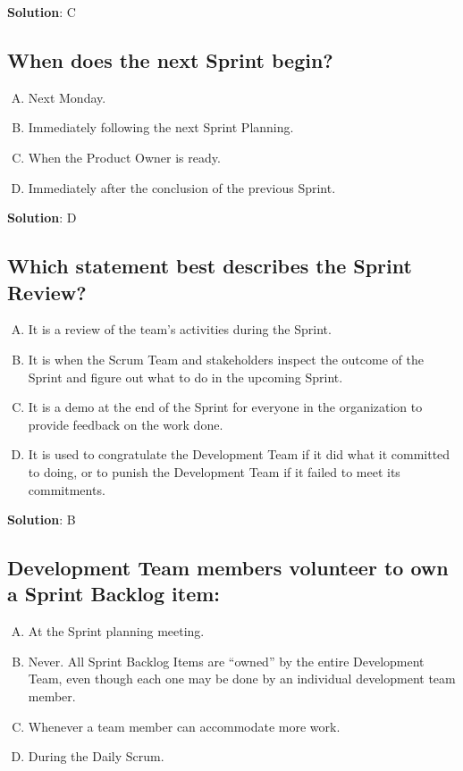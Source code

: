 \textbf{Solution}: C


\subsection{When does the next Sprint begin?}
\begin{enumerate}[A)]
  \item Next Monday.
  \item Immediately following the next Sprint Planning.
  \item When the Product Owner is ready.
  \item Immediately after the conclusion of the previous Sprint.
\end{enumerate}


\textbf{Solution}: D


\subsection{Which statement best describes the Sprint Review?}
\begin{enumerate}[A)]
  \item It is a review of the team's activities during the Sprint.
  \item It is when the Scrum Team and stakeholders inspect the outcome of the Sprint and figure out what to do in the upcoming Sprint.
  \item It is a demo at the end of the Sprint for everyone in the organization to provide feedback on the work done.
  \item It is used to congratulate the Development Team if it did what it committed to doing, or to punish the Development Team if it failed to meet its commitments.
\end{enumerate}


\textbf{Solution}: B


\subsection{Development Team members volunteer to own a Sprint Backlog item:}
\begin{enumerate}[A)]
  \item At the Sprint planning meeting.
  \item Never. All Sprint Backlog Items are \enquote{owned} by the entire Development Team, even though each one may be done by an individual development team member.
  \item Whenever a team member can accommodate more work.
  \item During the Daily Scrum.
\end{enumerate}


